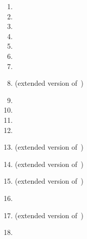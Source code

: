 \begin{enumerate}
	\item[\cite{FernauGHHVW19}] 
	\item[\cite{DBLP:conf/ictcs/Hoffman20}] 
	\item[\cite{DBLP:conf/cocoon/Hoffmann20}] 
	\item[\cite{DBLP:conf/lata/Hoffmann21a}] 
	\item[\cite{DBLP:conf/lata/Hoffmann21}] 
	\item[\cite{DBLP:conf/cocoon/Hoffmann21}] 
	\item[\cite{DBLP:conf/dlt/Hoffmann21a}] 
	\item[\cite{DBLP:journals/tcs/Hoffmann21}]  
	(extended version of~\cite{DBLP:conf/cocoon/Hoffmann20})
	\item[\cite{DBLP:conf/fct/Hoffmann21}] 
	\item[\cite{DBLP:conf/dcfs/Hoffmann21}] 
	\item[\cite{DBLP:conf/dcfs/Hoffmann22}] 
	\item[\cite{DBLP:conf/wia/Hoffmann22}] 
	\item[\cite{HoffmannCocoonExtended}]  
	(extended version of~\cite{DBLP:conf/cocoon/Hoffmann21})
	
		
	\item[\cite{HoffmannLATAextended2}] 
	(extended version of~\cite{DBLP:conf/lata/Hoffmann21})
		
	\item[\cite{HoffmannCircularExtended}] 
	(extended version of~\cite{DBLP:conf/lata/Hoffmann21a})
	
	\item[\cite{DBLP:conf/dlt/Hoffmann23}] 
	
	\item[\cite{Hoffmann2024}] 
	(extended version of~\cite{DBLP:conf/dlt/Hoffmann23})
	
	\item[\cite{DBLP:journals/jalc/000124}] 
\end{enumerate}

